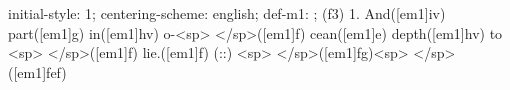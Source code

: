 initial-style: 1;
centering-scheme: english;
def-m1: \grealign;
(f3) 1. And([em1]iv) part([em1]g) in([em1]hv) o-<sp> </sp>([em1]f) cean([em1]e) depth([em1]hv) to <sp> </sp>([em1]f) lie.([em1]f) (::) <sp> </sp>([em1]fg)<sp> </sp>([em1]fef)